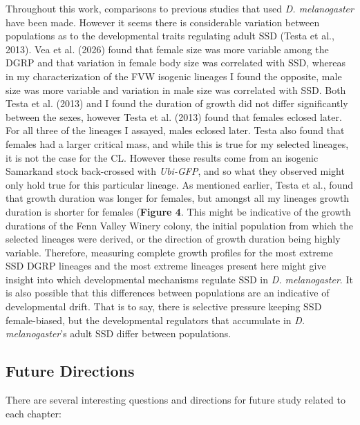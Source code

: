 \documentclass[12pt,reqno,oneside]{report}
\begin{document}
Throughout this work, comparisons to previous studies that used \textit{D. melanogaster} have been made. However it seems there is considerable variation between populations as to the developmental traits regulating adult SSD (Testa et al., 2013). Vea et al. (2026) found that female size was more variable among the DGRP and that variation in female body size was correlated with SSD, whereas in my characterization of the FVW isogenic lineages I found the opposite, male size was more variable and variation in male size was correlated with SSD. Both Testa et al. (2013) and I found the duration of growth did not differ significantly between the sexes, however Testa et al. (2013) found that females eclosed later. For all three of the lineages I assayed, males eclosed later. Testa also found that females had a larger critical mass, and while this is true for my selected lineages, it is not the case for the CL. However these results come from an isogenic Samarkand stock back-crossed with \textit{Ubi-GFP}, and so what they observed might only hold true for this particular lineage. As mentioned earlier, Testa et al., found that growth duration was longer for females, but amongst all my lineages growth duration is shorter for females (\textbf{Figure 4}. This might be indicative of the growth durations of the Fenn Valley Winery colony, the initial population from which the selected lineages were derived, or the direction of growth duration being highly variable. Therefore, measuring complete growth profiles for the most extreme SSD DGRP lineages and the most extreme lineages present here might give insight into which developmental mechanisms regulate SSD in \textit{D. melanogaster}. It is also possible that this differences between populations are an indicative of developmental drift. That is to say, there is selective pressure keeping SSD female-biased, but the developmental regulators that accumulate in \textit{D. melanogaster}'s adult SSD differ between populations.

\subsection{Future Directions}

There are several interesting questions and directions for future study related to each chapter:
\end{document}

